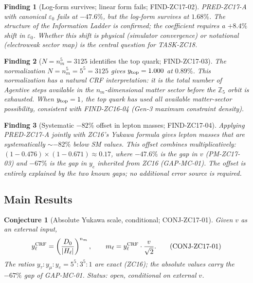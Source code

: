 \documentclass[12pt, a4paper]{article}
\newtheorem{conjecture}{Conjecture}[section]
\newtheorem{finding}{Finding}[section]
\begin{document}
\begin{finding}[Log-form survives; linear form fails;
  FIND-ZC17-02]
\label{zc17:find:log-survives}
PRED-ZC17-A with canonical $\varepsilon_0$ fails at $-47.6\%$,
but the log-form survives at $1.68\%$.
The structure of the Information Ladder is confirmed;
the coefficient requires a $+8.4\%$ shift in $\varepsilon_0$.
Whether this shift is physical (simulator convergence) or
notational (electroweak sector map) is the central question
for TASK-ZC18.
\end{finding}

\begin{finding}[$N=n_m^5=3125$ identifies the top quark;
  FIND-ZC17-03]
\label{zc17:find:ytop}
The normalization $N = n_m^5 = 5^5 = 3125$ gives
$y_{\rm top}=1.000$ at $0.89\%$. This normalization has a
natural CRF interpretation: it is the total number of
Agentive steps available in the $n_m$-dimensional matter
sector before the $\mathbb{Z}_5$ orbit is exhausted.
When $y_{\rm top}=1$, the top quark has used all available
matter-sector possibility, consistent with FIND-ZC16-04
(Gen-3 maximum constraint density).
\end{finding}

\begin{finding}[Systematic $-82\%$ offset in lepton masses;
  FIND-ZC17-04]
\label{zc17:find:systematic}
Applying PRED-ZC17-A jointly with ZC16's Yukawa formula gives
lepton masses that are systematically $\sim-82\%$ below SM values.
This offset combines multiplicatively:
$(1-0.476)\times(1-0.671)\approx 0.17$,
where $-47.6\%$ is the gap in $v$ (PM-ZC17-03) and $-67\%$
is the gap in $y_e$ inherited from ZC16 (GAP-MC-01).
The offset is entirely explained by the two known gaps;
no additional error source is required.
\end{finding}

\subsection{Main Results}
\label{zc17:sec:results}

\begin{conjecture}[Absolute Yukawa scale, conditional;
  CONJ-ZC17-01]
\label{zc17:conj:yukawa-conditional}
Given $v$ as an external input,
\begin{equation}
  y_\ell^{\rm CRF} = \left(\frac{D_0}{|H_\ell|}\right)^{n_m},
  \qquad
  m_\ell = y_\ell^{\rm CRF}\cdot\frac{v}{\sqrt{2}}.
  \tag{CONJ-ZC17-01}\label{zc17:eq:conj01}
\end{equation}
The ratios $y_\tau:y_\mu:y_e = 5^5:3^5:1$ are exact (ZC16);
the absolute values carry the $-67\%$ gap of GAP-MC-01.
Status: \emph{open, conditional on external $v$}.
\end{conjecture}
\end{document}
